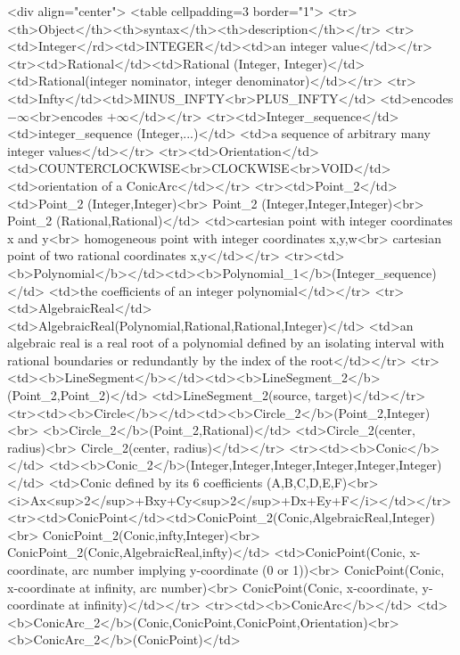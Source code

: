 \begin{ccHtmlOnly}
<div align="center">
<table cellpadding=3 border="1">
<tr><th>Object</th><th>syntax</th><th>description</th></tr>
<tr><td>Integer</rd><td>INTEGER</td><td>an integer value</td></tr>
<tr><td>Rational</td><td>Rational (Integer, Integer)</td>
  <td>Rational(integer nominator, integer denominator)</td></tr>
<tr><td>Infty</td><td>MINUS_INFTY<br>PLUS_INFTY</td>
  <td>encodes $-\infty$<br>encodes $+\infty$</td></tr>
<tr><td>Integer_sequence</td><td>integer_sequence (Integer,...)</td>
  <td>a sequence of arbitrary many integer values</td></tr>
<tr><td>Orientation</td><td>COUNTERCLOCKWISE<br>CLOCKWISE<br>VOID</td><td>orientation of a ConicArc</td></tr>
<tr><td>Point_2</td>
  <td>Point_2 (Integer,Integer)<br>
      Point_2 (Integer,Integer,Integer)<br>
      Point_2 (Rational,Rational)</td>
  <td>cartesian point with integer coordinates x and y<br>
      homogeneous point with integer coordinates x,y,w<br>
      cartesian point of two rational coordinates x,y</td></tr>
<tr><td><b>Polynomial</b></td><td><b>Polynomial_1</b>(Integer_sequence)</td>
  <td>the coefficients of an integer polynomial</td></tr>
<tr><td>AlgebraicReal</td>
    <td>AlgebraicReal(Polynomial,Rational,Rational,Integer)</td>
    <td>an algebraic real is a real root of a polynomial defined by an
        isolating interval with rational boundaries or redundantly by
	the index of the root</td></tr>
<tr><td><b>LineSegment</b></td><td><b>LineSegment_2</b>(Point_2,Point_2)</td>
  <td>LineSegment_2(source, target)</td></tr>
<tr><td><b>Circle</b></td><td><b>Circle_2</b>(Point_2,Integer)<br>
                              <b>Circle_2</b>(Point_2,Rational)</td>
  <td>Circle_2(center, radius)<br>
      Circle_2(center, radius)</td></tr>
<tr><td><b>Conic</b></td>
  <td><b>Conic_2</b>(Integer,Integer,Integer,Integer,Integer,Integer)</td>
  <td>Conic defined by its 6 coefficients (A,B,C,D,E,F)<br>
      <i>Ax<sup>2</sup>+Bxy+Cy<sup>2</sup>+Dx+Ey+F</i></td></tr>
<tr><td>ConicPoint</td><td>ConicPoint_2(Conic,AlgebraicReal,Integer)<br>
                           ConicPoint_2(Conic,infty,Integer)<br>
			   ConicPoint_2(Conic,AlgebraicReal,infty)</td>
                       <td>ConicPoint(Conic, x-coordinate, arc number implying y-coordinate (0 or 1))<br>
		           ConicPoint(Conic, x-coordinate at infinity, arc number)<br>
                           ConicPoint(Conic, x-coordinate, y-coordinate at infinity)</td></tr>
<tr><td><b>ConicArc</b></td>
    <td><b>ConicArc_2</b>(Conic,ConicPoint,ConicPoint,Orientation)<br>
        <b>ConicArc_2</b>(ConicPoint)</td>

\end{ccHtmlOnly}
